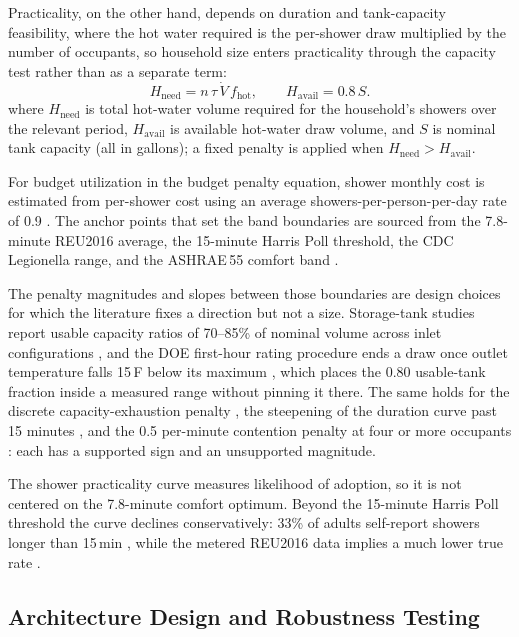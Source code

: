 \documentclass[final,3p,times]{elsarticle}
\begin{document}
Practicality, on the other hand, depends on duration and tank-capacity feasibility, where the hot water required is the per-shower draw multiplied by the number of occupants, so household size enters practicality through the capacity test rather than as a separate term:
\begin{equation}
  H_{\mathrm{need}} = n\,\tau\,\dot V\,f_{\mathrm{hot}}, \qquad
  H_{\mathrm{avail}} = 0.8\,S.
  \label{eq:shower_capacity_need_avail}
\end{equation}
\noindent where $H_{\mathrm{need}}$ is total hot-water volume required for the household's showers over the relevant period, $H_{\mathrm{avail}}$ is available hot-water draw volume, and $S$ is nominal tank capacity (all in gallons); a fixed penalty is applied when $H_{\mathrm{need}}>H_{\mathrm{avail}}$.

For budget utilization in the budget penalty equation, shower monthly cost is estimated from per-shower cost using an average showers-per-person-per-day rate of 0.9 \cite{reu2016}. The anchor points that set the band boundaries are sourced from the 7.8-minute REU2016 average, the 15-minute Harris Poll threshold, the CDC Legionella range, and the ASHRAE\,55 comfort band \cite{reu2016,harrispoll2024,cdc2026,ashrae55_2020}.

The penalty magnitudes and slopes between those boundaries are design choices for which the literature fixes a direction but not a size. Storage-tank studies report usable capacity ratios of 70--85\% of nominal volume across inlet configurations \cite{abdidin2024}, and the DOE first-hour rating procedure ends a draw once outlet temperature falls 15\,\textdegree{}F below its maximum \cite{shen2021}, which places the 0.80 usable-tank fraction inside a measured range without pinning it there. The same holds for the discrete capacity-exhaustion penalty \cite{marini2017}, the steepening of the duration curve past 15 minutes \cite{wilkes2005}, and the 0.5 per-minute contention penalty at four or more occupants \cite{rouleau2019}: each has a supported sign and an unsupported magnitude.

The shower practicality curve measures likelihood of adoption, so it is not centered on the 7.8-minute comfort optimum. Beyond the 15-minute Harris Poll threshold the curve declines conservatively: 33\% of adults self-report showers longer than 15\,min \cite{harrispoll2024}, while the metered REU2016 data implies a much lower true rate \cite{reu2016}.

\subsection{Architecture Design and Robustness Testing}
\end{document}
